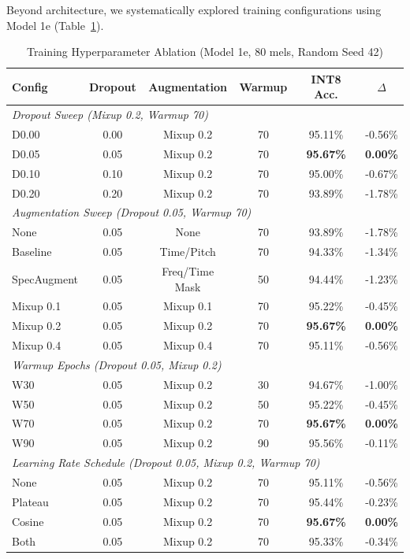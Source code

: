 \documentclass[10pt,a4paper,twoside]{article}
\begin{document}
Beyond architecture, we systematically explored training configurations using Model 1e (Table~\ref{tab:training_ablation}).

\begin{table}[h]
	\centering
	\caption{Training Hyperparameter Ablation (Model 1e, 80 mels, Random Seed 42)}
	\label{tab:training_ablation}
	\begin{tabular}{lccccc}
		\toprule
		\textbf{Config} & \textbf{Dropout} & \textbf{Augmentation} & \textbf{Warmup} & \textbf{INT8 Acc.} & \textbf{$\Delta$} \\
		\midrule
		\multicolumn{6}{l}{\textit{Dropout Sweep (Mixup 0.2, Warmup 70)}} \\
		\quad D0.00 & 0.00 & Mixup 0.2 & 70 & 95.11\% & -0.56\% \\
		\quad D0.05 & 0.05 & Mixup 0.2 & 70 & \textbf{95.67\%} & \textbf{0.00\%} \\
		\quad D0.10 & 0.10 & Mixup 0.2 & 70 & 95.00\% & -0.67\% \\
		\quad D0.20 & 0.20 & Mixup 0.2 & 70 & 93.89\% & -1.78\% \\
		\midrule
		\multicolumn{6}{l}{\textit{Augmentation Sweep (Dropout 0.05, Warmup 70)}} \\
		\quad None & 0.05 & None & 70 & 93.89\% & -1.78\% \\
		\quad Baseline & 0.05 & Time/Pitch & 70 & 94.33\% & -1.34\% \\
		\quad SpecAugment & 0.05 & Freq/Time Mask & 50 & 94.44\% & -1.23\% \\
		\quad Mixup 0.1 & 0.05 & Mixup 0.1 & 70 & 95.22\% & -0.45\% \\
		\quad Mixup 0.2 & 0.05 & Mixup 0.2 & 70 & \textbf{95.67\%} & \textbf{0.00\%} \\
		\quad Mixup 0.4 & 0.05 & Mixup 0.4 & 70 & 95.11\% & -0.56\% \\
		\midrule
		\multicolumn{6}{l}{\textit{Warmup Epochs (Dropout 0.05, Mixup 0.2)}} \\
		\quad W30 & 0.05 & Mixup 0.2 & 30 & 94.67\% & -1.00\% \\
		\quad W50 & 0.05 & Mixup 0.2 & 50 & 95.22\% & -0.45\% \\
		\quad W70 & 0.05 & Mixup 0.2 & 70 & \textbf{95.67\%} & \textbf{0.00\%} \\
		\quad W90 & 0.05 & Mixup 0.2 & 90 & 95.56\% & -0.11\% \\
		\midrule
		\multicolumn{6}{l}{\textit{Learning Rate Schedule (Dropout 0.05, Mixup 0.2, Warmup 70)}} \\
		\quad None & 0.05 & Mixup 0.2 & 70 & 95.11\% & -0.56\% \\
		\quad Plateau & 0.05 & Mixup 0.2 & 70 & 95.44\% & -0.23\% \\
		\quad Cosine & 0.05 & Mixup 0.2 & 70 & \textbf{95.67\%} & \textbf{0.00\%} \\
		\quad Both & 0.05 & Mixup 0.2 & 70 & 95.33\% & -0.34\% \\
		\bottomrule
	\end{tabular}
\end{table}
\end{document}
